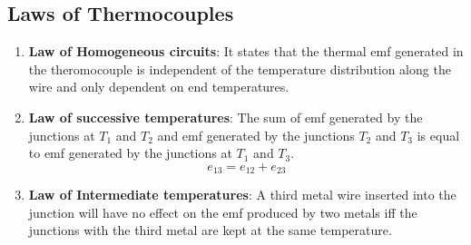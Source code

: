 \documentclass{article}
\begin{document}
	\subsection{Laws of Thermocouples}
	\begin{enumerate}
		\item \textbf{Law of Homogeneous circuits}: It states that the thermal emf generated in the theromocouple is independent of the temperature distribution along the wire and only dependent on end temperatures. 

		\item \textbf{Law of successive temperatures}: The sum of emf generated by the junctions at $T_1$ and $T_2$ and emf generated by the junctions $T_2$ and $T_3$ is equal to emf generated by the junctions at $T_1$ and $T_3$. 
		\[e_{13} = e_{12} + e_{23}\]

		\item \textbf{Law of Intermediate temperatures}: A third metal wire inserted into the junction will have no effect on the emf produced by two metals iff the junctions with the third metal are kept at the same temperature.







	\end{enumerate}







\end{document}

